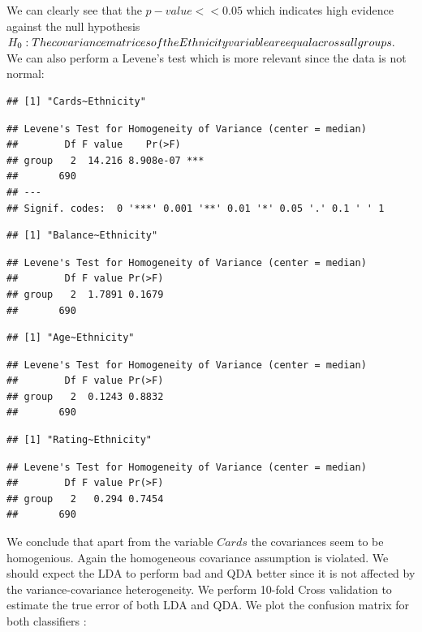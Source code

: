 \documentclass[]{article}
\begin{document}
We can clearly see that the \(p-value << 0.05\) which indicates high
evidence against the null hypothesis
\(H_0 : The \space covariance \space matrices \space of \space the \space Ethnicity \space variable \space are \space equal \space across \space all \space groups \space .\)
We can also perform a Levene's test which is more relevant since the
data is not normal:

\begin{verbatim}
## [1] "Cards~Ethnicity"
\end{verbatim}

\begin{verbatim}
## Levene's Test for Homogeneity of Variance (center = median)
##        Df F value    Pr(>F)    
## group   2  14.216 8.908e-07 ***
##       690                      
## ---
## Signif. codes:  0 '***' 0.001 '**' 0.01 '*' 0.05 '.' 0.1 ' ' 1
\end{verbatim}

\begin{verbatim}
## [1] "Balance~Ethnicity"
\end{verbatim}

\begin{verbatim}
## Levene's Test for Homogeneity of Variance (center = median)
##        Df F value Pr(>F)
## group   2  1.7891 0.1679
##       690
\end{verbatim}

\begin{verbatim}
## [1] "Age~Ethnicity"
\end{verbatim}

\begin{verbatim}
## Levene's Test for Homogeneity of Variance (center = median)
##        Df F value Pr(>F)
## group   2  0.1243 0.8832
##       690
\end{verbatim}

\begin{verbatim}
## [1] "Rating~Ethnicity"
\end{verbatim}

\begin{verbatim}
## Levene's Test for Homogeneity of Variance (center = median)
##        Df F value Pr(>F)
## group   2   0.294 0.7454
##       690
\end{verbatim}

We conclude that apart from the variable \(Cards\) the covariances seem
to be homogenious. Again the homogeneous covariance assumption is
violated. We should expect the LDA to perform bad and QDA better since
it is not affected by the variance-covariance heterogeneity. We perform
10-fold Cross validation to estimate the true error of both LDA and QDA.
We plot the confusion matrix for both classifiers :
\end{document}
